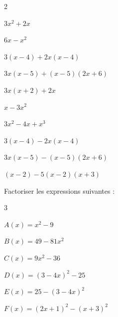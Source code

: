 \documentclass[10pt,a4paper]{article}  %
\begin{document}
\vspace*{-0.8cm}
\begin{multicols}{2}
	\begin{enumMet}
  \item $3 x^{2}+2 x$
  \item $6 x-x^{2}$
  \item $3(x-4)+2 x(x-4)$
  \item $3 x(x-5)+(x-5)(2 x+6)$
  \item $3 x(x+2)+2 x$
  \item $x-3 x^{2}$
  \item $3 x^{2}-4 x+x^{3}$
  \item $3(x-4)-2 x(x-4)$
  \item $3 x(x-5)-(x-5)(2 x+6)$
  \item $(x-2)-5(x-2)(x+3)$
\end{enumMet}
\end{multicols}
\vspace*{-0.8cm}
Factoriser les expressions suivantes :
\begin{multicols}{3}
	\begin{enumMet}
		\item $A(x)=x^{2}-9$
		\item $B(x)=49-81 x^{2}$
		\item $C(x)=9 x^{2}-36$
		\item $D(x)=(3-4 x)^{2}-25$
		\item $E(x)=25-(3-4 x)^{2}$
		\item $F(x)=(2 x+1)^{2}-(x+3)^{2}$
	\end{enumMet}
\end{multicols}
\vspace*{-0.8cm}
\end{document}

